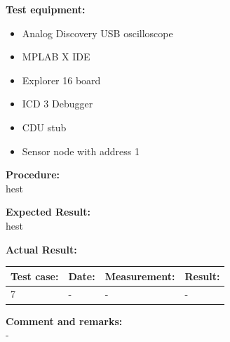 \textbf{Test equipment:}
\begin{itemize}
\item Analog Discovery USB oscilloscope
\item MPLAB X IDE
\item Explorer 16 board
\item ICD 3 Debugger
\item CDU stub
\item Sensor node with address 1
\end{itemize}

\textbf{Procedure:}\\
hest

\textbf{Expected Result:}\\
hest

\textbf{Actual Result:}\\
\begin{table}[H]
\centering
\begin{tabular}{|p{2cm}|p{2cm}|p{3cm}|p{2cm}|}\hline
\textbf{Test case:} & \textbf{Date:} & \textbf{Measurement:} & \textbf{Result:} \\ \hline
7 & - & - & - \\ \hline
\end{tabular}
\end{table}


\textbf{Comment and remarks:}\\
-\\